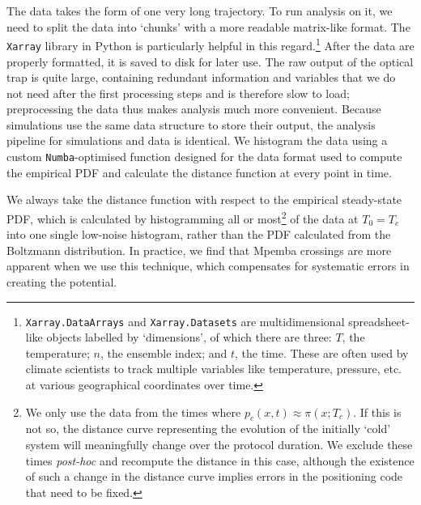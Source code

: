 \documentclass[hyperref={colorlinks=true, urlcolor=blue, citecolor=blue, final, bound}]{sfuthesis}
\begin{document}
The data takes the form of one very long trajectory. To run analysis on it, we need to split the data into `chunks' with a more readable matrix-like format. The \texttt{Xarray} library in Python is particularly helpful in this regard.\footnote{\texttt{Xarray.DataArrays} and \texttt{Xarray.Datasets} are multidimensional spreadsheet-like objects labelled by `dimensions', of which there are three: $T$, the temperature; $n$, the ensemble index; and $t$, the time. These are often used by climate scientists to track multiple variables like temperature, pressure, etc. at various geographical coordinates over time.} After the data are properly formatted, it is saved to disk for later use. The raw output of the optical trap is quite large, containing redundant information and variables that we do not need after the first processing steps and is therefore slow to load; preprocessing the data thus makes analysis much more convenient. Because simulations use the same data structure to store their output, the analysis pipeline for simulations and data is identical. We histogram the data using a custom \texttt{Numba}-optimised function designed for the data format used to compute the empirical PDF and calculate the distance function at every point in time. 

We always take the distance function with respect to the empirical steady-state PDF, which is calculated by histogramming all or most\footnote{We only use the data from the times where $p_c(x,t)\approx \pi(x;T_c)$. If this is not so, the distance curve representing the evolution of the initially `cold' system will meaningfully change over the protocol duration. We exclude these times \textit{post-hoc} and recompute the distance in this case, although the existence of such a change in the distance curve implies errors in the positioning code that need to be fixed.} of the data at $T_0=T_c$ into one single low-noise histogram, rather than the PDF calculated from the Boltzmann distribution. In practice, we find that Mpemba crossings are more apparent when we use this technique, which compensates for systematic errors in creating the potential.
\end{document}
